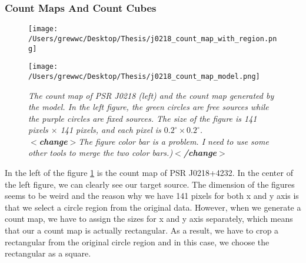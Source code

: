 \documentclass[12pt]{report}
\newcommand{\mycaption}[1]{\caption{\textit{\footnotesize #1}}}
\newcommand{\change}[1]{
  $<$\textbf{change}$>$#1$<$\textbf{/change}$>$
}
\begin{document}
          \subsubsection{Count Maps And Count Cubes}
          \begin{figure}[!ht]  
            \begin{minipage}{0.45\textwidth}
              \begin{center} 
                  \texttt{[image: /Users/grewwc/Desktop/Thesis/j0218\_count\_map\_with\_region.png]}
              \end{center}
            \end{minipage}
            \begin{minipage}{0.45\textwidth}
              \begin{center} 
                  \texttt{[image: /Users/grewwc/Desktop/Thesis/j0218\_count\_map\_model.png]}
              \end{center}
            \end{minipage}
            \begin{minipage}{\textwidth}
              \centering 
              \mycaption{The count map of PSR J0218 (left) and the count map generated by the model. In the left figure,
              the green circles are free sources while the purple circles are fixed sources.
              The size of the figure is 141 pixels $\times$ 141 pixels, and each pixel is $0.2^\circ \times 0.2^\circ$. 
              \\ \change{The figure color bar is a problem. I need to use some other tools to merge the two color bars.)}}
            \label{fig: j0218_count_map_and_model}    
            \end{minipage}
          \end{figure}
          In the left of the figure \ref{fig: j0218_count_map_and_model} 
          is the count map of PSR J0218+4232.
          In the center of the left figure, 
          we can clearly see our target source. The dimension of the figures seems to be weird and 
          the reason why we have 141 pixels for both x and y axis is that we select a circle region from 
          the original data. However, when we generate a count map, we have to assign the sizes for x and y 
          axis separately, which means that our a count map is actually rectangular. As a result, we have to crop a 
          rectangular from the original circle region and in this case, we choose the rectangular as a square.  
          
\end{document}
